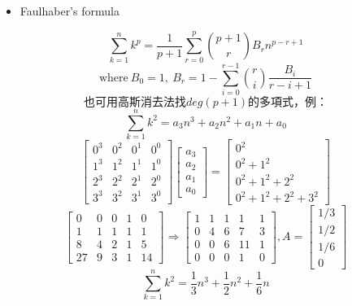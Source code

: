 \begin{itemize}
    \item Faulhaber's formula
\end{itemize}
\[ \sum_{k=1}^{n} k^p = \frac{1}{p+1} \sum_{r=0}^{p} \binom{p+1}{r} B_rn^{p-r+1} \]
\[ \text{where} \ B_0 = 1, \ B_r = 1-\sum_{i=0}^{r-1} \binom{r}{i} \frac{B_i}{r-i+1} \]
\[ 也可用高斯消去法找deg(p+1)的多項式，例： \]
\[ \sum_{k=1}^{n} k^2 = a_3n^3 + a_2n^2 + a_1n + a_0 \]
\tiny\[
    \begin{bmatrix}
        0^3 & 0^2 & 0^1 & 0^0\\
        1^3 & 1^2 & 1^1 & 1^0\\
        2^3 & 2^2 & 2^1 & 2^0\\
        3^3 & 3^2 & 3^1 & 3^0
    \end{bmatrix}
    \begin{bmatrix}
        a_3 \\ a_2 \\ a_1 \\ a_0
    \end{bmatrix} =
    \begin{bmatrix}
        0^2 \\ 0^2+1^2 \\ 0^2+1^2+2^2 \\ 0^2+1^2+2^2+3^2
    \end{bmatrix}
\]
\tiny\[
    \begin{bmatrix}
        0 & 0 & 0 & 1 & 0 \\
        1 & 1 & 1 & 1 & 1 \\
        8 & 4 & 2 & 1 & 5 \\
        27 & 9 & 3 & 1 & 14
    \end{bmatrix}
  \Rightarrow \begin{bmatrix}
        1 & 1 & 1 & 1 & 1 \\
        0 & 4 & 6 & 7 & 3 \\
        0 & 0 & 6 & 11 & 1 \\
        0 & 0 & 0 & 1 & 0
    \end{bmatrix}, 
    A = \begin{bmatrix}
        1/3 \\ 1/2 \\ 1/6 \\ 0 
    \end{bmatrix}
\]
\[ \sum_{k=1}^{n} k^2 = \frac{1}{3}n^3 + \frac{1}{2}n^2 + \frac{1}{6}n \]
